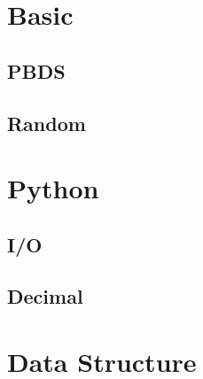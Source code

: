 \documentclass[a4paper,10pt,twocolumn,oneside]{article}
\begin{document}

%


\section{Basic}

% 

% 

\subsection{PBDS}


\subsection{Random}


\section{Python}
\subsection{I/O}


\subsection{Decimal}




\section{Data Structure}
\end{document}
